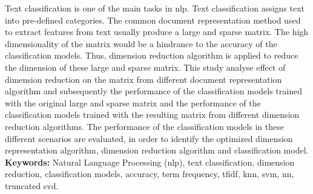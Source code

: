 Text classification is one of the main tasks in \ac{nlp}. Text classification assigns text into pre-defined categories. The common document representation method used to extract features from text usually produce a large and sparse matrix. The high dimensionality of the matrix would be a hindrance to the accuracy of the classification models. Thus, dimension reduction algorithm is applied to reduce the dimension of these large and sparse matrix. This study analyse effect of dimension reduction on the matrix from different document representation algorithm and subsequently the performance of the classification models trained with the original large and sparse matrix and the performance of the classification models trained with the resulting matrix from different dimension reduction algorithms. The performance of the classification models in these different scenarios are evaluated, in order to identify the optimized dimension representation algorithm, dimension reduction algorithm and classification model.\\

\textbf{Keywords: } Natural Language Processing (\ac{nlp}), text classification, dimension reduction, classification models, accuracy, term frequency, \ac{tfidf}, \ac{knn}, \ac{svm}, \ac{nn}, truncated \ac{svd}.
